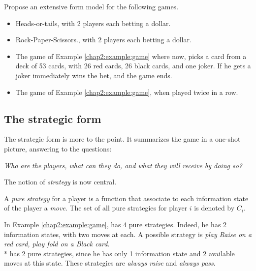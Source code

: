 \begin{exercise}
Propose an extensive form model for the following games. 
\begin{itemize}
\item Heads-or-tails, with 2 players each betting a dollar. 
\item Rock-Paper-Scissors., with 2 players each betting a dollar. 
\item The game of Example \ref{chap2:example:game} where now, \TAtwo{} picks a card from a deck of 53 cards, with 26 red cards, 26 black cards, and one joker. If he gets a joker \TAone{} immediately wins the bet, and the game ends.
\item The game of Example \ref{chap2:example:game}, when played twice in a row.
\end{itemize}
\end{exercise}
\subsection{The strategic form}
\label{subsec:StratForm}

The strategic form is more to the point. It summarizes the game in a one-shot picture, answering to the questions:

\begin{center}
\textit{Who are the players, what can they do, and what they will receive by doing so?}  
\end{center}

The notion of \emph{strategy} is now central.
\begin{definition}
A \emph{pure strategy} for a player is a function
 that associate to each information 
 state of the player a \emph{move}. 
 The set of all pure strategies for player $i$ is denoted by $C_i$.
\end{definition}

\begin{example}
In Example \ref{chap2:example:game}, 
\TAtwo{} has 4 pure strategies. Indeed, he has 2 information states, 
with two moves at each. A possible strategy is 
\emph{play Raise on a red card, play fold on a Black card}.\\*
\TAone{} has 2 pure strategies, since he has only 1 information state and 2 available moves at this state.
These strategies are \emph{always raise} and \emph{always pass}.
\end{example}

